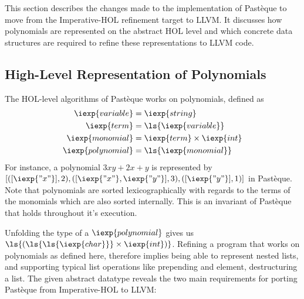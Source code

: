 \section{}\label{sec:methodology}

This section describes the changes made to the implementation of Pastèque to move from the Imperative-HOL refinement target to LLVM.
It discusses how polynomials are represented on the abstract HOL level and which concrete data structures are required to refine these representations to LLVM code.

\subsection{High-Level Representation of Polynomials}\label{sec:methodology_high-level-representation-of-polynomials}
The HOL-level algorithms of Pastèque works on polynomials, defined as
\begin{align*}
  \iexp{variable}   &= \iexp{string} \\
  \iexp{term}       &= \ls{\iexp{variable}} \\
  \iexp{monomial}   &= \iexp{term} \times \iexp{int} \\
  \iexp{polynomial} &= \ls{\iexp{monomial}}
\end{align*}
For instance, a polynomial $3xy + 2x + y$ is represented by
$[([\iexp{"x"}], 2), ([\iexp{"x"}, \iexp{"y"}], 3), ([\iexp{"y"}], 1)]$ in Pastèque.
Note that polynomials are sorted lexicographically with regards to the terms of the monomials which are also sorted internally.
This is an invariant of Pastèque that holds throughout it's execution.

Unfolding the type of a $\iexp{polynomial}$ gives us $\ls{(\ls{\ls{\iexp{char}}} \times \iexp{int})}$.
Refining a program that works on polynomials as defined here, therefore implies being able to represent nested lists, and supporting typical list operations like prepending and element, destructuring a list.
The given abstract datatype reveals the two main requirements for porting Pastèque from Imperative-HOL to LLVM:

